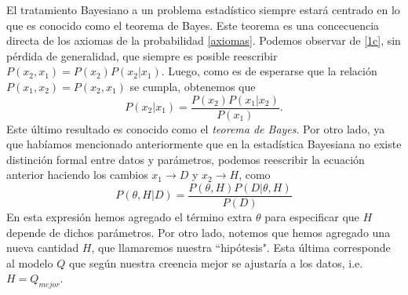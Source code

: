 \documentclass[onecolumn,           %
               showpacs,            %
               preprintnumbers,     %
               aps,                 %
               prl,          	    %
               letterpaper,             %
               superscriptaddress,      %
               nofootinbib,         %
               tightenlines,        %
               floats,floatfix      %
               ,usenatbib,
               ]{revtex4-1}
\begin{document}
El tratamiento Bayesiano a un problema estad\'istico siempre estar\'a centrado en lo que es conocido como el teorema de Bayes. Este teorema es una concecuencia directa de los axiomas de la probabilidad \eqref{axiomas}. Podemos observar de \eqref{1c}, sin p\'erdida de generalidad, que siempre es posible reescribir $P(x_2,x_1)=P(x_2)P(x_2|x_1)$. Luego, como es de esperarse que la relaci\'on $P(x_1,x_2)=P(x_2,x_1)$ se cumpla, obtenemos que
\begin{equation}
P(x_2|x_1)=\frac{P(x_2)P(x_1|x_2)}{P(x_1)}.
\end{equation}
Este \'ultimo resultado es conocido como el \textit{teorema de Bayes}. Por otro lado, ya que hab\'iamos mencionado anteriormente que en la estad\'istica Bayesiana no existe distinci\'on formal entre datos y par\'ametros, podemos reescribir la ecuaci\'on anterior haciendo los cambios $x_1\rightarrow D$ y $x_2\rightarrow H$, como
\begin{equation}\label{BayesT}
P(\theta,H|D)=\frac{P(\theta,H)P(D|\theta,H)}{P(D)}
\end{equation}
En esta expresi\'on hemos agregado el t\'ermino extra $\theta$ para especificar que $H$ depende de dichos par\'ametros. Por otro lado, notemos que hemos agregado una nueva cantidad $H$, que llamaremos nuestra ``hip\'otesis". Esta \'ultima corresponde al modelo $Q$ que seg\'un nuestra creencia mejor se ajustar\'ia a los datos, i.e. $H=Q_{mejor}$.
\end{document}
